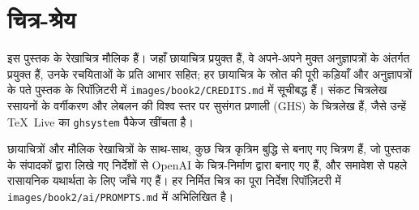 \chapter*{चित्र-श्रेय}

इस पुस्तक के रेखाचित्र मौलिक हैं। जहाँ छायाचित्र प्रयुक्त हैं, वे अपने-अपने मुक्त
अनुज्ञापत्रों के अंतर्गत प्रयुक्त हैं, उनके रचयिताओं के प्रति आभार सहित; हर छायाचित्र के
स्रोत की पूरी कड़ियाँ और अनुज्ञापत्रों के पते पुस्तक के रिपॉज़िटरी में
\texttt{images/book2/CREDITS.md} में सूचीबद्ध हैं।
संकट चित्रलेख रसायनों के वर्गीकरण और लेबलन की विश्व स्तर पर सुसंगत प्रणाली (GHS) के
चित्रलेख हैं, जैसे उन्हें \TeX\ Live का \texttt{ghsystem} पैकेज खींचता है।

\bigskip
छायाचित्रों और मौलिक रेखाचित्रों के साथ-साथ, कुछ चित्र
कृत्रिम बुद्धि से बनाए गए चित्रण हैं, जो पुस्तक के संपादकों द्वारा लिखे गए निर्देशों से
OpenAI के चित्र-निर्माण द्वारा बनाए गए हैं, और समावेश से पहले रासायनिक
यथार्थता के लिए जाँचे गए हैं। हर निर्मित चित्र का पूरा निर्देश
रिपॉज़िटरी में \texttt{images/book2/ai/PROMPTS.md} में अभिलिखित है।


